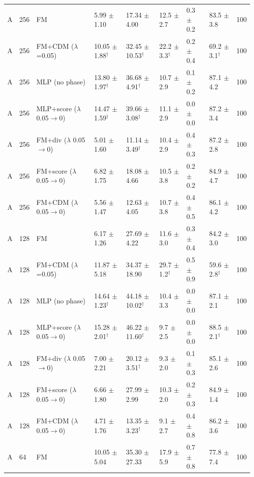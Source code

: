 \begin{tabular}{lllllllll}
A & 256 & FM & 5.99 $\pm$ 1.10 & 17.34 $\pm$ 4.00 & 12.5 $\pm$ 2.7 & 0.3 $\pm$ 0.2 & 83.5 $\pm$ 3.8 & 100 \\
A & 256 & FM+CDM ($\lambda$=0.05) & 10.05 $\pm$ 1.88$^\dagger$ & 32.45 $\pm$ 10.53$^\dagger$ & 22.2 $\pm$ 3.3$^\dagger$ & 0.2 $\pm$ 0.4 & 69.2 $\pm$ 3.1$^\dagger$ & 100 \\
A & 256 & MLP (no phase) & 13.80 $\pm$ 1.97$^\dagger$ & 36.68 $\pm$ 4.91$^\dagger$ & 10.7 $\pm$ 2.9 & 0.1 $\pm$ 0.2 & 87.1 $\pm$ 4.2 & 100 \\
A & 256 & MLP+score ($\lambda$ 0.05$\to$0) & 14.47 $\pm$ 1.59$^\dagger$ & 39.66 $\pm$ 3.08$^\dagger$ & 11.1 $\pm$ 2.9 & 0.0 $\pm$ 0.0 & 87.2 $\pm$ 3.4 & 100 \\
A & 256 & FM+div ($\lambda$ 0.05$\to$0) & 5.01 $\pm$ 1.60 & 11.14 $\pm$ 3.49$^\dagger$ & 10.4 $\pm$ 2.9 & 0.4 $\pm$ 0.3 & 87.2 $\pm$ 2.8 & 100 \\
A & 256 & FM+score ($\lambda$ 0.05$\to$0) & 6.82 $\pm$ 1.75 & 18.08 $\pm$ 4.66 & 10.5 $\pm$ 3.8 & 0.2 $\pm$ 0.2 & 84.9 $\pm$ 4.7 & 100 \\
A & 256 & FM+CDM ($\lambda$ 0.05$\to$0) & 5.56 $\pm$ 1.47 & 12.63 $\pm$ 4.05 & 10.7 $\pm$ 3.8 & 0.4 $\pm$ 0.5 & 86.1 $\pm$ 4.2 & 100 \\
A & 128 & FM & 6.17 $\pm$ 1.26 & 27.69 $\pm$ 4.22 & 11.6 $\pm$ 3.0 & 0.3 $\pm$ 0.4 & 84.2 $\pm$ 3.0 & 100 \\
A & 128 & FM+CDM ($\lambda$=0.05) & 11.87 $\pm$ 5.18 & 34.37 $\pm$ 18.90 & 29.7 $\pm$ 1.2$^\dagger$ & 0.5 $\pm$ 0.9 & 59.6 $\pm$ 2.8$^\dagger$ & 100 \\
A & 128 & MLP (no phase) & 14.64 $\pm$ 1.23$^\dagger$ & 44.18 $\pm$ 10.02$^\dagger$ & 10.4 $\pm$ 3.3 & 0.0 $\pm$ 0.0 & 87.1 $\pm$ 2.1 & 100 \\
A & 128 & MLP+score ($\lambda$ 0.05$\to$0) & 15.28 $\pm$ 2.01$^\dagger$ & 46.22 $\pm$ 11.60$^\dagger$ & 9.7 $\pm$ 2.5 & 0.0 $\pm$ 0.0 & 88.5 $\pm$ 2.1$^\dagger$ & 100 \\
A & 128 & FM+div ($\lambda$ 0.05$\to$0) & 7.00 $\pm$ 2.21 & 20.12 $\pm$ 3.51$^\dagger$ & 9.3 $\pm$ 2.0 & 0.1 $\pm$ 0.3 & 85.1 $\pm$ 2.6 & 100 \\
A & 128 & FM+score ($\lambda$ 0.05$\to$0) & 6.66 $\pm$ 1.80 & 27.99 $\pm$ 2.99 & 10.3 $\pm$ 2.0 & 0.2 $\pm$ 0.3 & 84.9 $\pm$ 1.4 & 100 \\
A & 128 & FM+CDM ($\lambda$ 0.05$\to$0) & 4.71 $\pm$ 1.76 & 13.35 $\pm$ 3.23$^\dagger$ & 9.1 $\pm$ 2.7 & 0.4 $\pm$ 0.8 & 86.2 $\pm$ 3.6 & 100 \\
A & 64 & FM & 10.05 $\pm$ 5.04 & 35.30 $\pm$ 27.33 & 17.9 $\pm$ 5.9 & 0.7 $\pm$ 0.8 & 77.8 $\pm$ 7.4 & 100 \\

\end{tabular}
